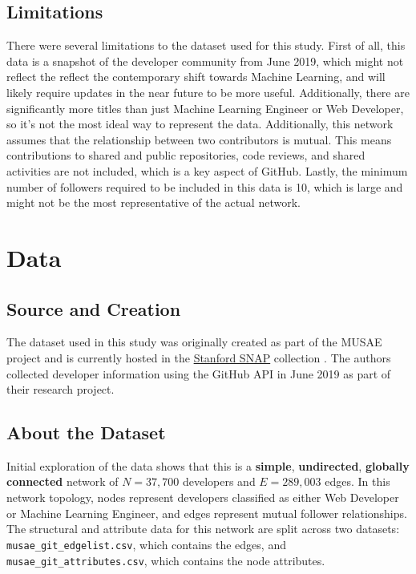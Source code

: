 \documentclass[letterpaper]{article}
\begin{document}
\subsection{Limitations}
There were several limitations to the dataset used for this study. First of all, this data is a snapshot of the developer community from June 2019, which might not reflect the reflect the contemporary shift towards Machine Learning, and will likely require updates in the near future to be more useful. Additionally, there are significantly more titles than just Machine Learning Engineer or Web Developer, so it's not the most ideal way to represent the data. Additionally, this network assumes that the relationship between two contributors is mutual. This means contributions to shared and public repositories, code reviews, and shared activities are not included, which is a key aspect of GitHub. Lastly, the minimum number of followers required to be included in this data is 10, which is large and might not be the most representative of the actual network.

\section{Data}
\subsection{Source and Creation}
The dataset used in this study was originally created as part of the MUSAE project and is currently hosted in the \href{https://snap.stanford.edu/data/github-social.html}{Stanford SNAP} collection \cite{snapnets}. The authors collected developer information using the GitHub API in June 2019 as part of their research project.

\subsection{About the Dataset}
Initial exploration of the data shows that this is a \textbf{simple}, \textbf{undirected}, \textbf{globally connected} network of $N = 37{,}700$ developers and $E = 289{,}003$ edges. In this network topology, nodes represent developers classified as either Web Developer or Machine Learning Engineer, and edges represent mutual follower relationships. The structural and attribute data for this network are split across two datasets: \texttt{musae\_git\_edgelist.csv}, which contains the edges, and \texttt{musae\_git\_attributes.csv}, which contains the node attributes.
\end{document}
